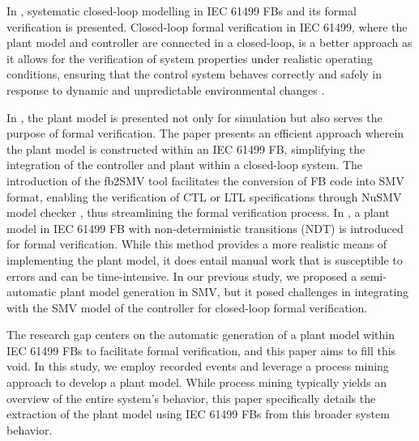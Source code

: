 \begin{bibunit}
In \cite{ vyatkin2008closed, pang2009systematic}, systematic closed-loop modelling in IEC 61499 FBs and its  formal verification is presented. Closed-loop formal verification in IEC 61499, where the plant model and controller are connected in a closed-loop, is a better approach \cite{sinha2019survey, xavier2023formal} as it allows for the verification of system properties under realistic operating conditions, ensuring that the control system behaves correctly and safely in response to dynamic and unpredictable environmental changes \cite{ovsiannikova2023formal}.



In \cite{hanisch2009one}, the plant model is presented not only for simulation but also serves the purpose of formal verification. The paper \cite{malik2017emulation} presents an efficient approach wherein the plant model is constructed within an IEC 61499 FB, simplifying the integration of the controller and plant within a closed-loop system. The introduction of the fb2SMV tool \cite{fb2smv} facilitates the conversion of FB code into SMV format, enabling the verification of CTL or LTL specifications through NuSMV model checker \cite{cimatti2002nusmv}, thus streamlining the formal verification process. In  \cite{xavier2021cyber}, a plant model in IEC 61499 FB with non-deterministic transitions (NDT) is introduced for formal verification. While this method provides a more realistic means of implementing the plant model, it does entail manual work that is susceptible to errors and can be time-intensive. In our previous study\cite{xavier2021plant}, we proposed a semi-automatic plant model generation in SMV, but it posed challenges in integrating with the SMV model of the controller for closed-loop formal verification.



The research gap centers on the automatic generation of a plant model within IEC 61499 FBs to facilitate formal verification, and this paper aims to fill this void. In this study, we employ recorded events and leverage a process mining approach to develop a plant model. While process mining typically yields an overview of the entire system's behavior, this paper specifically details the extraction of the plant model using IEC 61499 FBs from this broader system behavior.




\end{bibunit}
